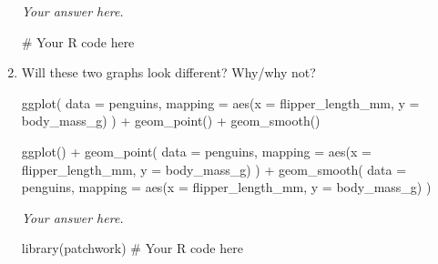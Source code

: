 \documentclass[
  letterpaper,
  DIV=11,
  numbers=noendperiod]{scrreprt}
\newenvironment{Shaded}{\begin{snugshade}}{\end{snugshade}}
\newcommand{\AttributeTok}[1]{\textcolor[rgb]{0.40,0.45,0.13}{#1}}
\newcommand{\CommentTok}[1]{\textcolor[rgb]{0.37,0.37,0.37}{#1}}
\newcommand{\FunctionTok}[1]{\textcolor[rgb]{0.28,0.35,0.67}{#1}}
\newcommand{\NormalTok}[1]{\textcolor[rgb]{0.00,0.23,0.31}{#1}}
\newcommand{\SpecialCharTok}[1]{\textcolor[rgb]{0.37,0.37,0.37}{#1}}
\begin{document}
\begin{enumerate}
\begin{tcolorbox}
  \emph{Your answer here.}

\begin{Shaded}
\begin{Highlighting}[]
\CommentTok{\# Your R code here}
\end{Highlighting}
\end{Shaded}

  \end{tcolorbox}
\item
  Will these two graphs look different? Why/why not?

\begin{Shaded}
\begin{Highlighting}[]
\FunctionTok{ggplot}\NormalTok{(}
  \AttributeTok{data =}\NormalTok{ penguins,}
  \AttributeTok{mapping =} \FunctionTok{aes}\NormalTok{(}\AttributeTok{x =}\NormalTok{ flipper\_length\_mm, }\AttributeTok{y =}\NormalTok{ body\_mass\_g)}
\NormalTok{) }\SpecialCharTok{+}
  \FunctionTok{geom\_point}\NormalTok{() }\SpecialCharTok{+}
  \FunctionTok{geom\_smooth}\NormalTok{()}

\FunctionTok{ggplot}\NormalTok{() }\SpecialCharTok{+}
  \FunctionTok{geom\_point}\NormalTok{(}
    \AttributeTok{data =}\NormalTok{ penguins,}
    \AttributeTok{mapping =} \FunctionTok{aes}\NormalTok{(}\AttributeTok{x =}\NormalTok{ flipper\_length\_mm, }\AttributeTok{y =}\NormalTok{ body\_mass\_g)}
\NormalTok{  ) }\SpecialCharTok{+}
  \FunctionTok{geom\_smooth}\NormalTok{(}
    \AttributeTok{data =}\NormalTok{ penguins,}
    \AttributeTok{mapping =} \FunctionTok{aes}\NormalTok{(}\AttributeTok{x =}\NormalTok{ flipper\_length\_mm, }\AttributeTok{y =}\NormalTok{ body\_mass\_g)}
\NormalTok{  )}
\end{Highlighting}
\end{Shaded}

  \begin{tcolorbox}[enhanced jigsaw, left=2mm, rightrule=.15mm, bottomtitle=1mm, opacitybacktitle=0.6, leftrule=.75mm, opacityback=0, colframe=quarto-callout-note-color-frame, bottomrule=.15mm, coltitle=black, toptitle=1mm, colback=white, titlerule=0mm, colbacktitle=quarto-callout-note-color!10!white, title={Answer}, toprule=.15mm, breakable, arc=.35mm]

  \emph{Your answer here.}

\begin{Shaded}
\begin{Highlighting}[]
\FunctionTok{library}\NormalTok{(patchwork)}
\CommentTok{\# Your R code here}
\end{Highlighting}
\end{Shaded}


\end{tcolorbox}
\end{enumerate}
\end{document}
